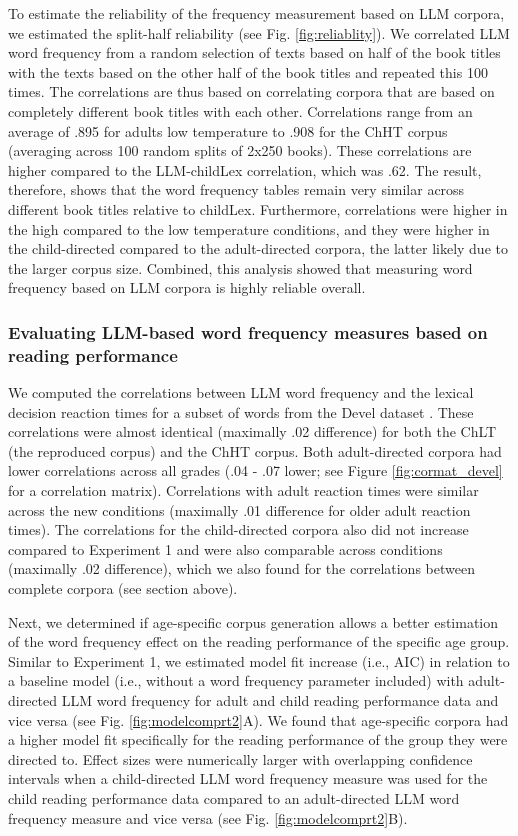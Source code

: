 \documentclass[doc, a4paper]{apa7}
\begin{document}
To estimate the reliability of the frequency measurement based on LLM corpora, we estimated the split-half reliability (see Fig. \ref{fig:reliablity}). We correlated LLM word frequency from a random selection of texts based on half of the book titles with the texts based on the other half of the book titles and repeated this 100 times. The correlations are thus based on correlating corpora that are based on completely different book titles with each other. Correlations range from an average of .895 for adults low temperature to .908 for the ChHT corpus (averaging across 100 random splits of 2x250 books). These correlations are higher compared to the LLM-childLex correlation, which was .62. The result, therefore, shows that the word frequency tables remain very similar across different book titles relative to childLex. Furthermore, correlations were higher in the high compared to the low temperature conditions, and they were higher in the child-directed compared to the adult-directed corpora, the latter likely due to the larger corpus size. Combined, this analysis showed that measuring word frequency based on LLM corpora is highly reliable overall.


\subsubsection*{Evaluating LLM-based word frequency measures based on reading performance}

We computed the correlations between LLM word frequency and the lexical decision reaction times for a subset of words from the Devel dataset \citep{schroter_developmental_2017}. These correlations were almost identical (maximally .02 difference) for both the ChLT (the reproduced corpus) and the ChHT corpus. Both adult-directed corpora had lower correlations across all grades (.04 - .07 lower; see Figure \ref{fig:cormat_devel} for a correlation matrix). Correlations with adult reaction times were similar across the new conditions (maximally .01 difference for older adult reaction times). The correlations for the child-directed corpora also did not increase compared to Experiment 1 and were also comparable across conditions (maximally .02 difference), which we also found for the correlations between complete corpora (see section above). 

Next, we determined if age-specific corpus generation allows a better estimation of the word frequency effect on the reading performance of the specific age group. Similar to Experiment 1, we estimated model fit increase (i.e.,  AIC) in relation to a baseline model (i.e., without a word frequency parameter included) with adult-directed LLM word frequency for adult and child reading performance data and vice versa (see Fig. \ref{fig:modelcomprt2}A). We found that age-specific corpora had a higher model fit specifically for the reading performance of the group they were directed to. Effect sizes were numerically larger with overlapping confidence intervals when a child-directed LLM word frequency measure was used for the child reading performance data compared to an adult-directed LLM word frequency measure and vice versa (see Fig. \ref{fig:modelcomprt2}B).
\end{document}
